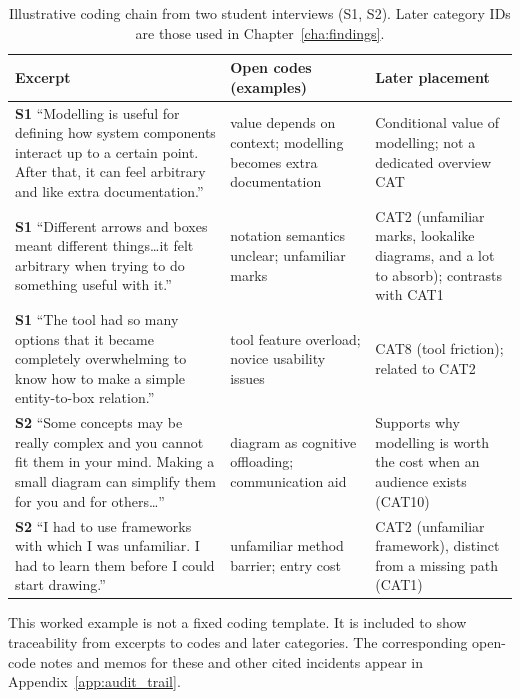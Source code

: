 \begin{table}[t]
\small
\setlength{\tabcolsep}{4pt}
\renewcommand{\arraystretch}{1.12}
\caption{Illustrative coding chain from two student interviews (S1, S2). Later category IDs are those used in Chapter~\ref{cha:findings}.}
\label{tab:coding_example_students_compact}
\begin{tabularx}{\textwidth}{p{} X X}
\toprule
\textbf{Excerpt} & \textbf{Open codes (examples)} & \textbf{Later placement} \\
\midrule

\textbf{S1} ``Modelling is useful for defining how system components interact up to a certain point. After that, it can feel arbitrary and like extra documentation.'' &
value depends on context; modelling becomes extra documentation &
Conditional value of modelling; not a dedicated overview CAT \\

\addlinespace

\textbf{S1} ``Different arrows and boxes meant different things\ldots it felt arbitrary when trying to do something useful with it.'' &
notation semantics unclear; unfamiliar marks &
CAT2 (unfamiliar marks, lookalike diagrams, and a lot to absorb); contrasts with CAT1 \\

\addlinespace

\textbf{S1} ``The tool had so many options that it became completely overwhelming to know how to make a simple entity-to-box relation.'' &
tool feature overload; novice usability issues &
CAT8 (tool friction); related to CAT2 \\

\midrule

\textbf{S2} ``Some concepts may be really complex and you cannot fit them in your mind. Making a small diagram can simplify them for you and for others\ldots'' &
diagram as cognitive offloading; communication aid &
Supports why modelling is worth the cost when an audience exists (CAT10) \\

\addlinespace

\textbf{S2} ``I had to use frameworks with which I was unfamiliar. I had to learn them before I could start drawing.'' &
unfamiliar method barrier; entry cost &
CAT2 (unfamiliar framework), distinct from a missing path (CAT1) \\

\bottomrule
\end{tabularx}
\end{table}

This worked example is not a fixed coding template. It is included to show traceability from excerpts to codes and later categories. The corresponding open-code notes and memos for these and other cited incidents appear in Appendix~\ref{app:audit_trail}.

